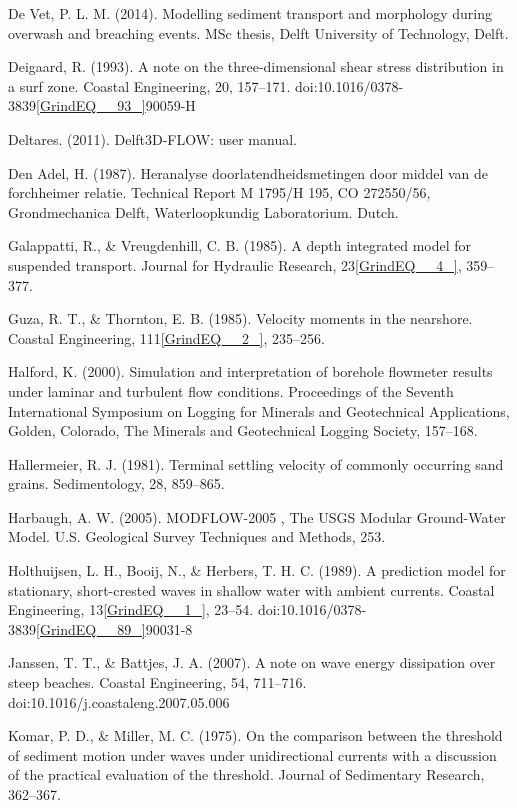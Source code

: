 \documentclass{article}
\begin{document}
\noindent De Vet, P. L. M. (2014). Modelling sediment transport and morphology during overwash and breaching events. MSc thesis, Delft University of Technology, Delft.

\noindent Deigaard, R. (1993). A note on the three-dimensional shear stress distribution in a surf zone. Coastal Engineering, 20, 157--171. doi:10.1016/0378-3839\eqref{GrindEQ__93_}90059-H

\noindent Deltares. (2011). Delft3D-FLOW: user manual.

\noindent Den Adel, H. (1987). Heranalyse doorlatendheidsmetingen door middel van de forchheimer relatie. Technical Report M 1795/H 195, CO 272550/56, Grondmechanica Delft, Waterloopkundig Laboratorium. Dutch.

\noindent Galappatti, R., \& Vreugdenhill, C. B. (1985). A depth integrated model for suspended transport. Journal for Hydraulic Research, 23\eqref{GrindEQ__4_}, 359--377.

\noindent Guza, R. T., \& Thornton, E. B. (1985). Velocity moments in the nearshore. Coastal Engineering, 111\eqref{GrindEQ__2_}, 235--256.

\noindent Halford, K. (2000). Simulation and interpretation of borehole flowmeter results under laminar and turbulent flow conditions. Proceedings of the Seventh International Symposium on Logging for Minerals and Geotechnical Applications, Golden, Colorado, The Minerals and Geotechnical Logging Society, 157--168.

\noindent Hallermeier, R. J. (1981). Terminal settling velocity of commonly occurring sand grains. Sedimentology, 28, 859--865.

\noindent Harbaugh, A. W. (2005). MODFLOW-2005 , The USGS Modular Ground-Water Model. U.S. Geological Survey Techniques and Methods, 253.

\noindent Holthuijsen, L. H., Booij, N., \& Herbers, T. H. C. (1989). A prediction model for stationary, short-crested waves in shallow water with ambient currents. Coastal Engineering, 13\eqref{GrindEQ__1_}, 23--54. doi:10.1016/0378-3839\eqref{GrindEQ__89_}90031-8

\noindent Janssen, T. T., \& Battjes, J. A. (2007). A note on wave energy dissipation over steep beaches. Coastal Engineering, 54, 711--716. doi:10.1016/j.coastaleng.2007.05.006

\noindent Komar, P. D., \& Miller, M. C. (1975). On the comparison between the threshold of sediment motion under waves under unidirectional currents with a discussion of the practical evaluation of the threshold. Journal of Sedimentary Research, 362--367.
\end{document}
